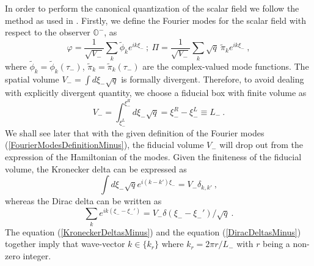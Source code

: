 \documentclass[aps,12pt,showpacs]{revtex4-2}
\def\observerminus{\mathbb{O}^{-}}
\begin{document}
In order to perform the canonical quantization of the scalar field we follow 
the method as used in \cite{Hossain:2010eb}. Firstly, we define the Fourier 
modes for the scalar field with respect to the observer $\observerminus$, as
%
\begin{equation}\label{FourierModesDefinitionMinus}
\varphi =  \frac{1}{\sqrt{V_{-}}}\sum_{k} \tilde{\phi}_{k} e^{i k \xi_{-}} ~;~
\Pi =  \frac{1}{\sqrt{V_{-}}} \sum_{k} \sqrt{q}~ \tilde{\pi}_{k} 
e^{i k \xi_{-}} ~,
\end{equation}
%
where $\tilde{\phi}_{k} = \tilde{\phi}_{k} (\tau_{-})$, 
$\tilde{\pi}_{k} = \tilde{\pi}_{k} (\tau_{-})$ are the complex-valued mode 
functions. The spatial volume $V_{-} = \int d\xi_{-}\sqrt{q}$ is formally 
divergent. Therefore, to avoid dealing with explicitly divergent quantity, we 
choose a fiducial box with finite volume as 
%
\begin{equation}\label{SpatialVoumeMinus}
V_{-} = \int_{\xi_{-}^L}^{\xi_{-}^R} d\xi_{-}\sqrt{q} = {\xi_{-}^R} - 
{\xi_{-}^L} \equiv L_{-} ~.
\end{equation}
%
We shall see later that with the given definition of the Fourier modes 
(\ref{FourierModesDefinitionMinus}), the fiducial volume $V_{-}$ will drop out 
from the expression of the Hamiltonian of the modes. Given the finiteness of 
the 
fiducial volume, the Kronecker delta can be expressed as
%
\begin{equation}\label{KroneckerDeltasMinus}
\int d\xi_{-}\sqrt{q}  e^{i(k-k')\xi_{-}} = V_{-} \delta_{k,k'} ~,
\end{equation}
%
whereas the Dirac delta can be written as
%
\begin{equation}\label{DiracDeltasMinus}
\sum_k e^{ik(\xi_{-}-\xi_{-}')} = V_{-} \delta(\xi_{-}-\xi_{-}')/\sqrt{q} ~.
\end{equation}
%
The equation (\ref{KroneckerDeltasMinus}) and the equation 
(\ref{DiracDeltasMinus}) together imply that wave-vector $k \in \{k_r\}$ 
where $k_r = 2\pi r/L_{-}$ with $r$ being a non-zero integer. 
\end{document}
